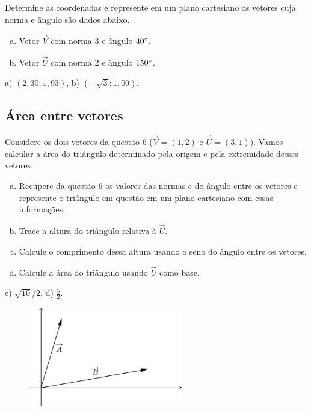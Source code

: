 \documentclass[main.tex]{subfiles}
\begin{document}
\begin{questao}
Determine as coordenadas e represente em um plano cartesiano os vetores cuja norma e ângulo são dados abaixo.
\begin{enumerate}[a)]
\item Vetor $\overrightarrow{V}$ com norma $3$ e ângulo $40\degree$.
\item Vetor $\overrightarrow{U}$ com norma $2$ e ângulo $150\degree$.
\end{enumerate}
\end{questao}

\begin{gabarito}
	\begin{gabaritoQuestao}
		a) $(2,30;1,93)$, b) $(-\sqrt{3};1,00)$.
	\end{gabaritoQuestao}
\end{gabarito}

\subsection*{Área entre vetores}

\begin{questao}
Considere os dois vetores da questão 6 ($\overrightarrow{V}=(1,2)$ e $\overrightarrow{U}=(3,1)$). Vamos calcular a área do triângulo determinado pela origem e pela extremidade desses vetores.
\begin{enumerate}[a)]
\item Recupere da questão 6 os valores das normas e do ângulo entre os vetores e represente o triângulo em questão em um plano cartesiano com essas informações.
\item Trace a altura do triângulo relativa à $\overrightarrow{U}$.
\item Calcule o comprimento dessa altura usando o seno do ângulo entre os vetores.
\item Calcule a área do triângulo usando $\overrightarrow{U}$ como base.
\end{enumerate}
\end{questao}

\begin{gabarito}
	\begin{gabaritoQuestao}
		c) $\sqrt{10}/2$, d) $\frac{5}{2}$.
	\end{gabaritoQuestao}
\end{gabarito}

\begin{figure}[h]
\centering
\includegraphics[width=0.6\textwidth]{./img/c4q8.png}
\end{figure}
\end{document}
